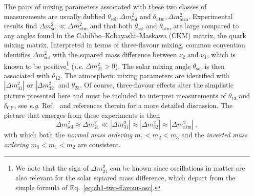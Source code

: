 The pairs of mixing parameters associated with these two classes of measurements
are usually dubbed $\theta_{\text{sol}}, \Delta m^{2}_{\text{sol}}$ and
$\theta_{\text{atm}}, \Delta m^{2}_{\text{atm}}$. Experimental results find
$\Delta m^{2}_{\text{sol}} \ll \Delta m^{2}_{\text{atm}}$ and that both
$\theta_{\text{sol}}$ and $\theta_{\text{atm}}$ are large compared to any angles
found in the Cabibbo--Kobayashi--Maskawa (CKM) matrix, the quark mixing matrix.
Interpreted in terms of three-flavour mixing, common convention identifies
$\Delta m_{\text{sol}}^{2}$ with the squared mass difference between $\nu_{2}$
and $\nu_{1}$, which is known to be positive\footnote{We note that the sign of
  $\Delta m_{21}^{2}$ can be known since oscillations in matter are also
  relevant for the solar squared mass difference, which depart from the simple
  formula of Eq.~\eqref{eq:ch1-two-flavour-osc}.} (\textit{i.e.}
$\Delta m^{2}_{21} > 0$). The solar mixing angle $\theta_{\text{sol}}$ is then
associated with $\theta_{12}$. The atmospheric mixing parameters are identified
with $|\Delta m_{31}^{2}|$ or $|\Delta m_{32}^{2}|$ and $\theta_{23}$. Of
course, three-flavour effects alter the simplistic picture presented here and
must be included to interpret measurements of $\theta_{13}$ and
$\delta_{\text{CP}}$, see \textit{e.g.} Ref.~\cite{Giganti:2017fhf} and
references therein for a more detailed discussion. The picture that emerges from
these experiments is then
\begin{equation}
  \Delta m^{2}_{\text{sol}} \approx \Delta m^{2}_{21} \ll |\Delta m_{31}^{2}| \approx |\Delta m_{32}^{2}| \approx |\Delta m_{\text{atm}}^{2}| \ ,
\end{equation}
with which both the \textit{normal mass ordering} $m_{1} < m_{2} < m_{3}$ and
the \textit{inverted mass ordering} $m_{3} < m_{1} < m_{2}$ are consistent.

